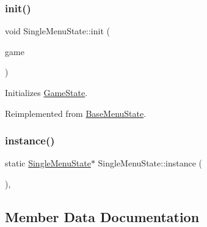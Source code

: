 \mbox{\label{class_single_menu_state_a9494d848c97fe4d406f122f3d97bc38d}} 
\subsubsection{\texorpdfstring{init()}{init()}}
{\footnotesize\ttfamily void Single\+Menu\+State\+::init (\begin{DoxyParamCaption}\item[{\mbox{\hyperlink{class_game_engine}{Game\+Engine}} $\ast$}]{game }\end{DoxyParamCaption})\hspace{0.3cm}{\ttfamily [virtual]}}



Initializes \mbox{\hyperlink{class_game_state}{Game\+State}}. 



Reimplemented from \mbox{\hyperlink{class_base_menu_state_ae29d522c56a4582ce79e113426421741}{Base\+Menu\+State}}.

\mbox{\label{class_single_menu_state_a608d05075dbe38e9e9a84b189b89d411}} 
\subsubsection{\texorpdfstring{instance()}{instance()}}
{\footnotesize\ttfamily static \mbox{\hyperlink{class_single_menu_state}{Single\+Menu\+State}}$\ast$ Single\+Menu\+State\+::instance (\begin{DoxyParamCaption}{ }\end{DoxyParamCaption})\hspace{0.3cm}{\ttfamily [inline]}, {\ttfamily [static]}}



\subsection{Member Data Documentation}
\mbox{\label{class_single_menu_state_acd999dc3a327d8cb340b9f46abc08397}} 

